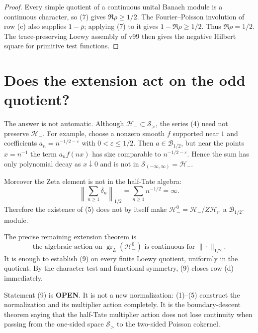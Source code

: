 \documentclass[11pt]{article}
\newcommand{\OPEN}{\textcolor{red!70!black}{\textbf{OPEN}}}
\begin{document}
\begin{proof}
Every simple quotient of a continuous unital Banach module is a continuous
character, so (7) gives $\Re\rho\ge1/2$.  The Fourier--Poisson involution of
row (c) also supplies $1-\bar\rho$; applying (7) to it gives
$1-\Re\rho\ge1/2$.  Thus $\Re\rho=1/2$.  The trace-preserving Loewy
assembly of v99 then gives the negative Hilbert square for primitive test
functions.
\end{proof}

\section{Does the extension act on the odd quotient?}

The answer is not automatic.  Although $\mathcal H_-\subset\mathcal S_>$,
the series (4) need not preserve $\mathcal H_-$.  For example, choose a
nonzero smooth $f$ supported near $1$ and coefficients
$a_n=n^{-1/2-\varepsilon}$ with $0<\varepsilon\le1/2$.  Then
$a\in\mathcal B_{1/2}$, but near the points $x=n^{-1}$ the term
$a_n f(nx)$ has size comparable to $n^{-1/2-\varepsilon}$.  Hence the sum
has only polynomial decay as $x\downarrow0$ and is not in
$\mathcal S_{(-\infty,\infty)}=\mathcal H_-$.

Moreover the Zeta element is not in the half-Tate algebra:
\begin{equation}
              \left\|\sum_{n\ge1}\delta_n\right\|_{1/2}
              =\sum_{n\ge1}n^{-1/2}=\infty.          \tag{8}
\end{equation}
Therefore the existence of (5) does not by itself make
$\mathcal H_-^0=\mathcal H_-/Z\mathcal H_\cap$ a
$\mathcal B_{1/2}$-module.

The precise remaining extension theorem is
\begin{equation}
 \boxed{
 \text{the algebraic action on }\operatorname{gr}_L(\mathcal H_-^0)
 \text{ is continuous for }\|\cdot\|_{1/2}.}         \tag{9}
\end{equation}
It is enough to establish (9) on every finite Loewy quotient, uniformly in
the quotient.  By the character test and functional symmetry, (9) closes
row (d) immediately.

Statement (9) is \OPEN.  It is not a new normalization: (1)--(5) construct
the normalization and its multiplier action completely.  It is the
boundary-descent theorem saying that the half-Tate multiplier action does
not lose continuity when passing from the one-sided space $\mathcal S_>$
to the two-sided Poisson cokernel.
\end{document}
